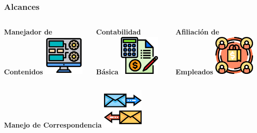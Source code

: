 \documentclass[xcolor=dvipsnames, xcolor=table]{beamer}
\begin{document}
\begin{frame}
    \frametitle{Alcances}
        \vspace{5mm}
    \begin{columns}
      \begin{column}{0.3\textwidth}
        \centering\textbf{\textcolor{color3}{\small Manejador de Contenidos}\vspace{3mm}}
        \vspace{10mm}
        \includegraphics[width=20mm]{002-monitor}
      \end{column}
      \begin{column}{0.3\textwidth}
        \centering\textbf{\textcolor{color3}{\small Contabilidad Básica}\vspace{3mm}}
        \vspace{10mm}
        \includegraphics[width=20mm]{001-accounting}
      \end{column}
      \begin{column}{0.3\textwidth}
        \centering\textbf{\textcolor{color3}{\small Afiliación de Empleados}\vspace{3mm}}
        \vspace{10mm}
        \includegraphics[width=20mm]{003-affiliate}
      \end{column}
    \end{columns}
    \vspace{-2mm}
    \begin{columns}
      \begin{column}{0.3\textwidth}
        \centering\textbf{\textcolor{color3}{\small Manejo de Correspondencia}\vspace{3mm}}
        \vspace{10mm}
        \includegraphics[width=20mm]{026-message}

\end{column}
\end{columns}
\end{frame}
\end{document}
